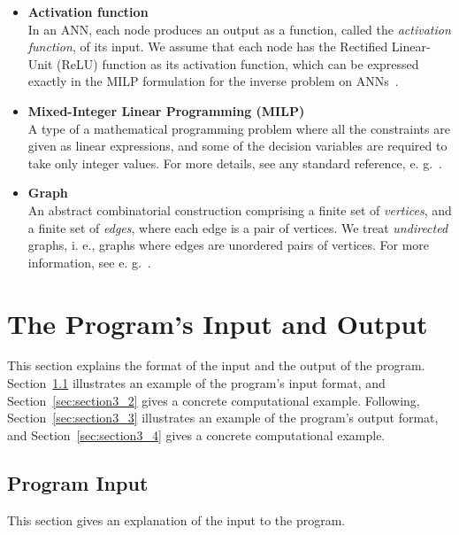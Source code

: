 \documentclass[11pt,titlepage,dvipdfmx,twoside]{book}
\begin{document}
\begin{itemize}
\item {\bf Activation function}\\
%
In an ANN, each node produces an output as a function, called the \emph{activation function}, 
of its input.
We assume that each node has the Rectified Linear-Unit (ReLU) function 
as its activation function,
which can be expressed exactly in the MILP formulation
for the inverse problem on ANNs~\cite{AN19}.

\item {\bf Mixed-Integer Linear Programming (MILP)}\\
%
A type of a mathematical programming problem
where all the constraints are given as linear expressions, and
some of the decision variables are required to take
only integer values.
For more details, see any standard reference, e. g.~\cite{LP}.


\item {\bf Graph} \\
An abstract combinatorial construction comprising
a finite set of {\em vertices}, and a finite set of {\em edges},
where each edge is a pair of vertices.
We treat {\em undirected} graphs,
i. e., graphs where edges are unordered pairs of vertices.
For more information, see e. g.~\cite{graph}.

\end{itemize}


\section{The Program's Input and Output}
\label{sec:InOut}

This section explains the format of the input and the output of the program.
Section~\ref{sec:section3_1} illustrates an example of the program's input format,
and Section~\ref{sec:section3_2} gives a concrete computational example.
Following, Section~\ref{sec:section3_3} illustrates an example of the program's output format,
and Section~\ref{sec:section3_4} gives a concrete computational example.


\subsection{Program Input}
\label{sec:section3_1}

This section gives an explanation of the input to the program.
\end{document}
